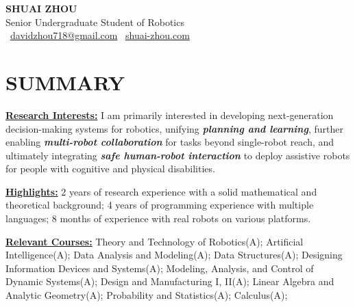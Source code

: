 \documentclass[a4paper,9pt]{extarticle}
\begin{document}
\pagestyle{fancy}
\renewcommand{\headrulewidth}{0pt}
\fancyhead{}
\thispagestyle{empty} %

\begin{center}
{\fontsize{24pt}{36pt}\selectfont\textbf{SHUAI ZHOU}}\\[3pt] %
Senior Undergraduate Student of Robotics \\[2pt]
\faEnvelope\ \href{mailto:davidzhou718@gmail.com}{davidzhou718@gmail.com}
\textbar{}
\faHome\ \href{https://www.shuai-zhou.com}{shuai-zhou.com}
\end{center}

\section*{{\textbf{\fontsize{14pt}{8pt}\selectfont S}\textbf{\scshape UMMARY}}}
\underline{\textbf{Research Interests:}} I am primarily interested in developing next-generation decision-making systems for robotics, unifying \textit{\textbf{planning and learning}}, further enabling \textit{\textbf{multi-robot collaboration}} for tasks beyond single-robot reach, and ultimately integrating \textit{\textbf{safe human-robot interaction}} to deploy assistive robots for people with cognitive and physical disabilities.
\par\vspace{4pt}\noindent
\underline{\textbf{Highlights:}} 2 years of research experience with a solid mathematical and theoretical background; 4 years of programming experience with multiple languages; 8 months of experience with real robots on various platforms.
\par\vspace{4pt}\noindent
\underline{\textbf{Relevant Courses:}} Theory and Technology of Robotics(A); Artificial Intelligence(A); Data Analysis and Modeling(A); Data Structures(A); Designing Information Devices and Systems(A); Modeling, Analysis, and Control of Dynamic Systems(A); Design and Manufacturing I, II(A); Linear Algebra and Analytic Geometry(A); Probability and Statistics(A); Calculus(A);
\end{document}
